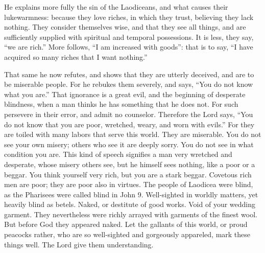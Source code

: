 He explains more fully the sin of the Laodiceans, and what causes their lukewarmness: because they love riches, in which they trust, believing they lack nothing. They consider themselves wise, and that they see all things, and are sufficiently supplied with spiritual and temporal possessions. It is less, they say, “we are rich.” More follows, “I am increased with goods”: that is to say, “I have acquired so many riches that I want nothing.”

That same he now refutes, and shows that they are utterly deceived, and are to be miserable people. For he rebukes them severely, and says, “You do not know what you are.” That ignorance is a great evil, and the beginning of desperate blindness, when a man thinks he has something that he does not. For such persevere in their error, and admit no counselor. Therefore the Lord says, “You do not know that you are poor, wretched, weary, and worn with evils.” For they are toiled with many labors that serve this world. They are miserable. You do not see your own misery; others who see it are deeply sorry. You do not see in what condition you are. This kind of speech signifies a man very wretched and desperate, whose misery others see, but he himself sees nothing, like a poor or a beggar. You think yourself very rich, but you are a stark beggar. Covetous rich men are poor; they are poor also in virtues. The people of Laodicea were blind, as the Pharisees were called blind in John 9. Well-sighted in worldly matters, yet heavily blind as betels. Naked, or destitute of good works. Void of your wedding garment. They nevertheless were richly arrayed with garments of the finest wool. But before God they appeared naked. Let the gallants of this world, or proud peacocks rather, who are so well-sighted and gorgeously appareled, mark these things well. The Lord give them understanding.
